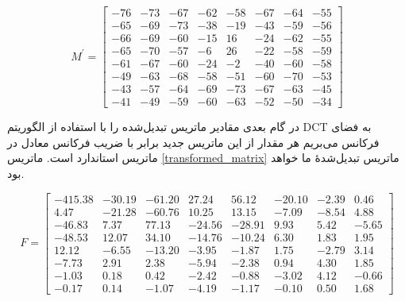 \begin{equation}    
                M^\prime = \begin{bmatrix}
                        -76 & -73 & -67 & -62 & -58 & -67 & -64 & -55\\
                        -65 & -69 & -73 & -38 & -19 & -43 & -59 & -56 \\
                        -66 & -69 & -60 & -15 & 16 & -24 & -62 & -55 \\
                        -65 & -70 & -57 & -6 & 26 & -22 & -58 & -59 \\
                        -61 & -67 & -60 & -24 & -2 & -40 & -60 & -58 \\
                        -49 & -63 & -68 & -58 & -51 & -60 & -70 & -53 \\
                        -43 & -57 & -64 & -69 & -73 & -67 & -63 & -45 \\
                        -41 & -49 & -59 & -60 & -63 & -52 & -50 & -34 
                        
                \end{bmatrix}
                \label{shifted_matrix}
\end{equation}

در گام بعدی مقادیر ماتریس تبدیل‌شده را با استفاده از الگوریتم 
DCT به فضای فرکانس می‌بریم
هر مقدار از این ماتریس جدید برابر با ضریب فرکانس معادل در ماتریس 
استاندارد است. ماتریس \ref{transformed_matrix} ماتریس تبدیل‌شده‌ٔ ما خواهد بود.

\begin{equation}        
        F = \begin{bmatrix}
                -415.38 & -30.19 & -61.20 & 27.24 & 56.12 & -20.10 & -2.39 & 0.46\\
                4.47 & -21.28 & -60.76 & 10.25 & 13.15 & -7.09 & -8.54 & 4.88 \\
                -46.83 & 7.37 & 77.13 & -24.56 & -28.91 & 9.93 & 5.42 & -5.65 \\
                -48.53 & 12.07 & 34.10 & -14.76 & -10.24 & 6.30 & 1.83 & 1.95 \\
                12.12 & -6.55 & -13.20 & -3.95 & -1.87 & 1.75 & -2.79 & 3.14 \\
                -7.73 & 2.91 & 2.38 & -5.94 & -2.38 & 0.94 & 4.30 & 1.85 \\
                -1.03 & 0.18 & 0.42 & -2.42 & -0.88 & -3.02 & 4.12 & -0.66 \\
                -0.17 & 0.14 & -1.07 & -4.19 & -1.17 & -0.10 & 0.50 & 1.68 

        \end{bmatrix}
        \label{transformed_matrix}        
\end{equation}

